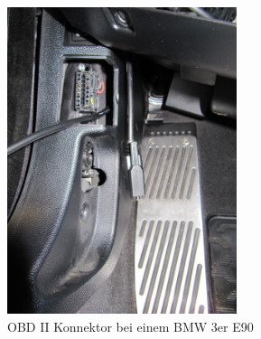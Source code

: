 \begin{figure}[!htb]\centering
	\includegraphics[width=0.6\textwidth]{images/3erobd}
	\caption{OBD II Konnektor bei einem BMW 3er E90 \cite{3er.OBD}}\label{Fig:Data3}
\end{figure}

\clearpage %
